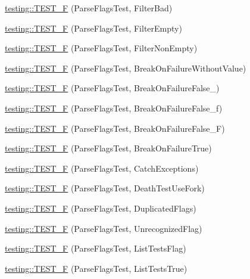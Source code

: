 \begin{DoxyCompactItemize}
\mbox{\hyperlink{namespacetesting_a3b7a3374630035ab3cf2125a0c960435}{testing\+::\+T\+E\+S\+T\+\_\+F}} (Parse\+Flags\+Test, Filter\+Bad)
\item 
\mbox{\hyperlink{namespacetesting_ac368692db2bffa72a1bf12f3469efec0}{testing\+::\+T\+E\+S\+T\+\_\+F}} (Parse\+Flags\+Test, Filter\+Empty)
\item 
\mbox{\hyperlink{namespacetesting_a31336a2ed0eea5de8066f5ae528a7ae0}{testing\+::\+T\+E\+S\+T\+\_\+F}} (Parse\+Flags\+Test, Filter\+Non\+Empty)
\item 
\mbox{\hyperlink{namespacetesting_ab540cabc9d829c20052609a685a01832}{testing\+::\+T\+E\+S\+T\+\_\+F}} (Parse\+Flags\+Test, Break\+On\+Failure\+Without\+Value)
\item 
\mbox{\hyperlink{namespacetesting_ac5a39f27868bd123d9c5bca03730845e}{testing\+::\+T\+E\+S\+T\+\_\+F}} (Parse\+Flags\+Test, Break\+On\+Failure\+False\+\_)
\item 
\mbox{\hyperlink{namespacetesting_afe2c0e1666f3dad816ae5dbdfc37357a}{testing\+::\+T\+E\+S\+T\+\_\+F}} (Parse\+Flags\+Test, Break\+On\+Failure\+False\+\_\+f)
\item 
\mbox{\hyperlink{namespacetesting_a92c1ef6a2453eaec5c33bb92dfd3667f}{testing\+::\+T\+E\+S\+T\+\_\+F}} (Parse\+Flags\+Test, Break\+On\+Failure\+False\+\_\+F)
\item 
\mbox{\hyperlink{namespacetesting_a2a23ab14983f9e6296149ac711301968}{testing\+::\+T\+E\+S\+T\+\_\+F}} (Parse\+Flags\+Test, Break\+On\+Failure\+True)
\item 
\mbox{\hyperlink{namespacetesting_a9e50d6fa46cc314e8d7fa4a829ee6c0d}{testing\+::\+T\+E\+S\+T\+\_\+F}} (Parse\+Flags\+Test, Catch\+Exceptions)
\item 
\mbox{\hyperlink{namespacetesting_a767f2b2467c0242492922c205a666e64}{testing\+::\+T\+E\+S\+T\+\_\+F}} (Parse\+Flags\+Test, Death\+Test\+Use\+Fork)
\item 
\mbox{\hyperlink{namespacetesting_a76c39020708d7e6646c8aeef149ea827}{testing\+::\+T\+E\+S\+T\+\_\+F}} (Parse\+Flags\+Test, Duplicated\+Flags)
\item 
\mbox{\hyperlink{namespacetesting_a876c9749edf7e23132e0b47ad8cfe02c}{testing\+::\+T\+E\+S\+T\+\_\+F}} (Parse\+Flags\+Test, Unrecognized\+Flag)
\item 
\mbox{\hyperlink{namespacetesting_a3fb86cb10e61ed9007bd22c5ba3b2c62}{testing\+::\+T\+E\+S\+T\+\_\+F}} (Parse\+Flags\+Test, List\+Tests\+Flag)
\item 
\mbox{\hyperlink{namespacetesting_a5ce87a07245c10d86d465cb8db493065}{testing\+::\+T\+E\+S\+T\+\_\+F}} (Parse\+Flags\+Test, List\+Tests\+True)

\end{DoxyCompactItemize}
